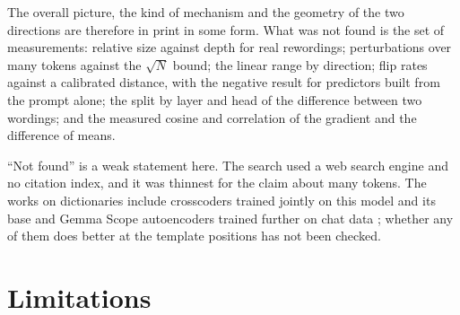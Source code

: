 \documentclass[11pt]{article}
\begin{document}
The overall picture, the kind of mechanism and the geometry of the two directions are therefore in print in some form. What was not found is the set of measurements: relative size against depth for real rewordings; perturbations over many tokens against the $\sqrt N$ bound; the linear range by direction; flip rates against a calibrated distance, with the negative result for predictors built from the prompt alone; the split by layer and head of the difference between two wordings; and the measured cosine and correlation of the gradient and the difference of means.

``Not found'' is a weak statement here. The search used a web search engine and no citation index, and it was thinnest for the claim about many tokens. The works on dictionaries include crosscoders trained jointly on this model and its base \cite{minder} and Gemma Scope autoencoders trained further on chat data \cite{yeo}; whether any of them does better at the template positions has not been checked.

\section{Limitations}
\label{sec:limitations}
\end{document}
